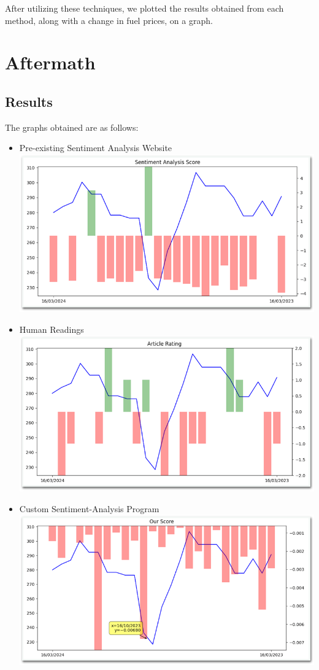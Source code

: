 \documentclass{report}
\begin{document}
After utilizing these techniques, we plotted the results obtained from each
method, along with a change in fuel prices, on a graph.

\chapter{Aftermath}
\section{Results}
The graphs obtained are as follows:
\begin{itemize}
    \item Pre-existing Sentiment Analysis Website
          \\
          \includegraphics{images/web_analysis.png}
          \newpage
    \item Human Readings
          \\
          \includegraphics{images/human_readings.png}
    \item Custom Sentiment-Analysis Program
          \\
          \includegraphics{images/our_program.png}
\end{itemize}
\end{document}
